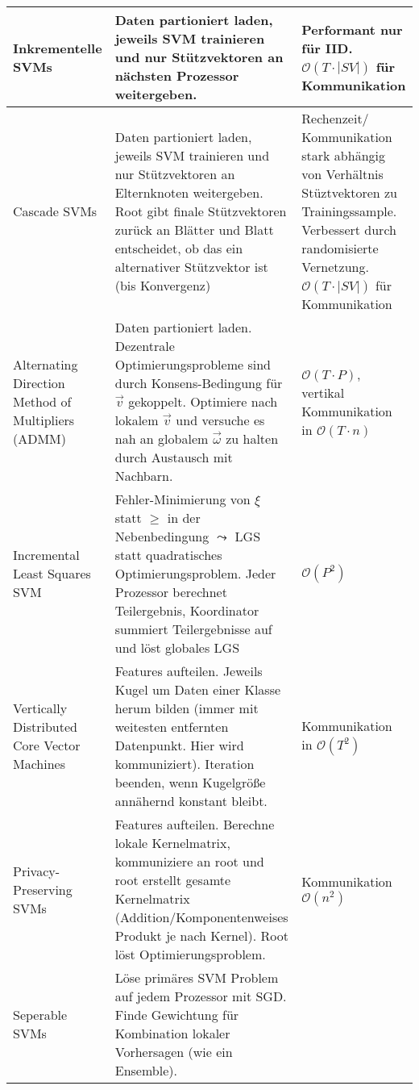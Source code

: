 \documentclass[11pt]{scrartcl}
\begin{document}
\begin{xltabular}{\linewidth}{p{25mm}|p{70mm}p{35mm}}
    \hline
    Inkrementelle SVMs & 
        Daten partioniert laden, jeweils SVM trainieren und nur Stützvektoren
        an nächsten Prozessor weitergeben. & 
        Performant nur für IID. $\mathcal{O}(T \cdot | SV |)$ für Kommunikation \\
    \hline
    Cascade SVMs & 
        Daten partioniert laden, jeweils SVM trainieren und nur Stützvektoren
        an Elternknoten weitergeben. Root gibt finale Stützvektoren zurück 
        an Blätter und Blatt entscheidet, ob das ein alternativer Stützvektor 
        ist (bis Konvergenz) & 
        Rechenzeit/ Kommunikation stark abhängig von Verhältnis Stüztvektoren
        zu Trainingssample. Verbessert durch randomisierte Vernetzung. 
        $\mathcal{O}(T \cdot | SV |)$ für Kommunikation \\
    \hline
    Alternating Direction Method of Multipliers (ADMM) & 
        Daten partioniert laden. Dezentrale Optimierungsprobleme
        sind durch Konsens-Bedingung für
        $\vec{v}$ gekoppelt. Optimiere nach lokalem $\vec{v}$ und versuche 
        es nah an globalem $\vec{\omega}$ zu halten durch Austausch mit Nachbarn. & 
        $\mathcal{O}(T \cdot P)$, vertikal Kommunikation in $\mathcal{O}(T \cdot n)$ \\
    \hline
    Incremental Least Squares SVM  & 
        Fehler-Minimierung von $\xi$ statt $\geq$ in der Nebenbedingung 
        $\leadsto$ LGS statt quadratisches Optimierungsproblem. Jeder Prozessor berechnet
        Teilergebnis, Koordinator summiert Teilergebnisse auf und löst globales LGS & 
        $\mathcal{O}(P^2)$ \\
    \hline
    Vertically Distributed Core Vector Machines & 
        Features aufteilen. Jeweils Kugel um Daten einer Klasse herum bilden 
        (immer mit weitesten entfernten Datenpunkt. Hier wird kommuniziert). Iteration beenden,
        wenn Kugelgröße annähernd konstant bleibt. & 
        Kommunikation in $\mathcal{O}(T^2)$ \\
    \hline
    Privacy-Preserving SVMs &
        Features aufteilen. Berechne lokale Kernelmatrix, kommuniziere an root und root erstellt
        gesamte Kernelmatrix (Addition/Komponentenweises Produkt je nach Kernel). Root löst 
        Optimierungsproblem. & Kommunikation $\mathcal{O}(n^2)$\\
    \hline
    Seperable SVMs &
        Löse primäres SVM Problem auf jedem Prozessor mit SGD. Finde Gewichtung für Kombination
        lokaler Vorhersagen (wie ein Ensemble). & \\
    \hline

\end{xltabular}
\end{document}
